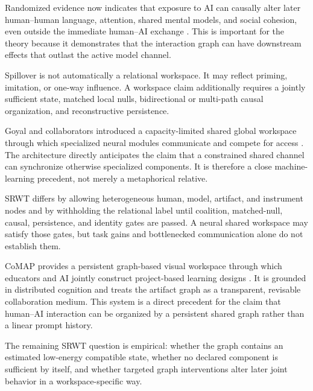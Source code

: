 
Randomized evidence now indicates that exposure to AI can causally alter later
human--human language, attention, shared mental models, and social cohesion,
even outside the immediate human--AI exchange \cite{SRWT:RiedlEtAl2026}. This is
important for the theory because it demonstrates that the interaction graph can
have downstream effects that outlast the active model channel.

Spillover is not automatically a relational workspace. It may reflect
priming, imitation, or one-way influence. A workspace claim additionally
requires a jointly sufficient state, matched local nulls, bidirectional or
multi-path causal organization, and reconstructive persistence.


Goyal and collaborators introduced a capacity-limited shared global workspace
through which specialized neural modules communicate and compete for access
\cite{SRWT:GoyalEtAl2022}. The architecture directly anticipates the claim that a
constrained shared channel can synchronize otherwise specialized components.
It is therefore a close machine-learning precedent, not merely a metaphorical
relative.

SRWT differs by allowing heterogeneous human, model, artifact, and instrument
nodes and by withholding the relational label until coalition, matched-null,
causal, persistence, and identity gates are passed. A neural shared workspace
may satisfy those gates, but task gains and bottlenecked communication alone do
not establish them.


CoMAP provides a persistent graph-based visual workspace through which
educators and AI jointly construct project-based learning designs
\cite{SRWT:LiJiang2026}. It is grounded in distributed cognition and treats the
artifact graph as a transparent, revisable collaboration medium. This system
is a direct precedent for the claim that human--AI interaction can be organized
by a persistent shared graph rather than a linear prompt history.

The remaining SRWT question is empirical: whether the graph contains an
estimated low-energy compatible state, whether no declared component is
sufficient by itself, and whether targeted graph interventions alter later
joint behavior in a workspace-specific way.


